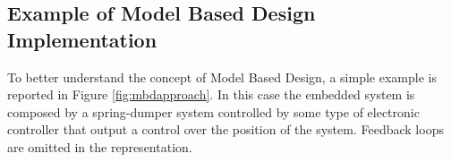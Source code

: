 \documentclass[../main.tex]{subfiles}
\begin{document}
\subsection{Example of Model Based Design Implementation}
To better understand the concept of Model Based Design, a simple example is reported in Figure \ref{fig:mbdapproach}. In this case the embedded system is composed by a spring-dumper system controlled by some type of electronic controller that output a control over the position of the system. Feedback loops are omitted in the representation.
\begin{figure}[h]
    \centering
    \begin{tikzpicture}[x=0.75pt,y=0.75pt,yscale=-1,xscale=1]


\end{tikzpicture}
\end{figure}
\end{document}
